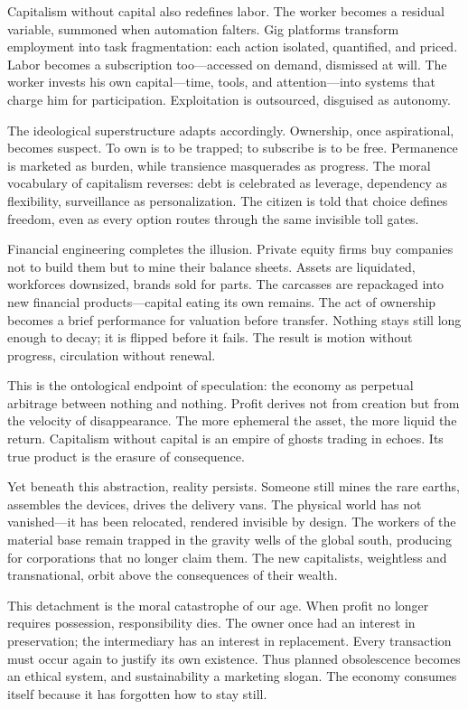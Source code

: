 \documentclass[11pt,twoside]{book}
\begin{document}
Capitalism without capital also redefines labor.  The worker becomes a residual variable, summoned when automation falters.  Gig platforms transform employment into task fragmentation: each action isolated, quantified, and priced.  Labor becomes a subscription too—accessed on demand, dismissed at will.  The worker invests his own capital—time, tools, and attention—into systems that charge him for participation.  Exploitation is outsourced, disguised as autonomy.

The ideological superstructure adapts accordingly.  Ownership, once aspirational, becomes suspect.  To own is to be trapped; to subscribe is to be free.  Permanence is marketed as burden, while transience masquerades as progress.  The moral vocabulary of capitalism reverses: debt is celebrated as leverage, dependency as flexibility, surveillance as personalization.  The citizen is told that choice defines freedom, even as every option routes through the same invisible toll gates.

Financial engineering completes the illusion.  Private equity firms buy companies not to build them but to mine their balance sheets.  Assets are liquidated, workforces downsized, brands sold for parts.  The carcasses are repackaged into new financial products—capital eating its own remains.  The act of ownership becomes a brief performance for valuation before transfer.  Nothing stays still long enough to decay; it is flipped before it fails.  The result is motion without progress, circulation without renewal.

This is the ontological endpoint of speculation: the economy as perpetual arbitrage between nothing and nothing.  Profit derives not from creation but from the velocity of disappearance.  The more ephemeral the asset, the more liquid the return.  Capitalism without capital is an empire of ghosts trading in echoes.  Its true product is the erasure of consequence.

Yet beneath this abstraction, reality persists.  Someone still mines the rare earths, assembles the devices, drives the delivery vans.  The physical world has not vanished—it has been relocated, rendered invisible by design.  The workers of the material base remain trapped in the gravity wells of the global south, producing for corporations that no longer claim them.  The new capitalists, weightless and transnational, orbit above the consequences of their wealth.

This detachment is the moral catastrophe of our age.  When profit no longer requires possession, responsibility dies.  The owner once had an interest in preservation; the intermediary has an interest in replacement.  Every transaction must occur again to justify its own existence.  Thus planned obsolescence becomes an ethical system, and sustainability a marketing slogan.  The economy consumes itself because it has forgotten how to stay still.
\end{document}
